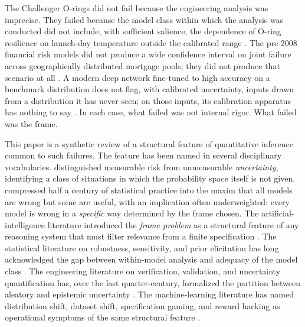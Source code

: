 \documentclass[11pt,a4paper]{article}
\begin{document}
The Challenger O-rings did not fail because the engineering analysis was
imprecise. They failed because the model class within which the analysis
was conducted did not include, with sufficient salience, the dependence of
O-ring resilience on launch-day temperature outside the calibrated range
\citep{Vaughan1996}. The pre-2008 financial risk models did not produce a
wide confidence interval on joint failure across geographically distributed
mortgage pools; they did not produce that scenario at all
\citep{KingKay2020}. A modern deep network fine-tuned to high accuracy on a
benchmark distribution does not flag, with calibrated uncertainty, inputs
drawn from a distribution it has never seen; on those inputs, its
calibration apparatus has nothing to say
\citep{QuioneroCandela2009,Amodei2016}. In each case, what failed was not
internal rigor. What failed was the frame.

This paper is a synthetic review of a structural feature of quantitative
inference common to such failures. The feature has been named in several
disciplinary vocabularies. \citet{Knight1921} distinguished measurable
risk from unmeasurable \emph{uncertainty}, identifying a class of
situations in which the probability space itself is not given.
\citet{Box1976,Box1979} compressed half a century of statistical practice
into the maxim that all models are wrong but some are useful, with an
implication often underweighted: every model is wrong in a \emph{specific}
way determined by the frame chosen. The artificial-intelligence literature
introduced the \emph{frame problem} as a structural feature of any
reasoning system that must filter relevance from a finite specification
\citep{McCarthyHayes1969,Dennett1984,Pylyshyn1987,Shanahan2016}. The
statistical literature on robustness, sensitivity, and prior elicitation
has long acknowledged the gap between within-model analysis and adequacy
of the model class
\citep{Berger1985,Saltelli2008,DraperJRSS1995,HoetingBMA1999}. The
engineering literature on verification, validation, and uncertainty
quantification has, over the last quarter-century, formalized the partition
between aleatory and epistemic uncertainty
\citep{HeltonOberkampf2004,OberkampfRoy2010,Walker2003}. The
machine-learning literature has named distribution shift, dataset shift,
specification gaming, and reward hacking as operational symptoms of the
same structural feature
\citep{QuioneroCandela2009,Amodei2016,Christian2020,HullermeierWaegeman2021}.
\end{document}
